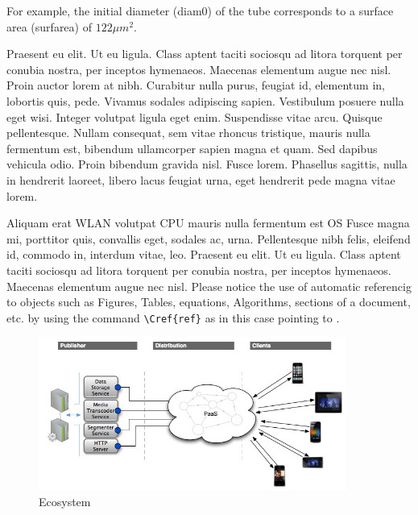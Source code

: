 For example, the initial diameter (\gls{diam0}) of the tube corresponds to a surface area (\gls{surfarea}) of $122 \mu{m}^2$.

Praesent eu elit. Ut eu ligula. Class aptent taciti sociosqu ad litora torquent per conubia nostra, per inceptos hymenaeos. Maecenas elementum augue nec nisl. Proin auctor lorem at nibh. Curabitur nulla purus, feugiat id, elementum in, lobortis quis, pede. Vivamus sodales adipiscing sapien. Vestibulum posuere nulla eget wisi. Integer volutpat ligula eget enim. Suspendisse vitae arcu. Quisque pellentesque. Nullam consequat, sem vitae rhoncus tristique, mauris nulla fermentum est, bibendum ullamcorper sapien magna et quam. Sed dapibus vehicula odio. Proin bibendum gravida nisl. Fusce lorem. Phasellus sagittis, nulla in hendrerit laoreet, libero lacus feugiat urna, eget hendrerit pede magna vitae lorem. 
 
Aliquam erat \ac{WLAN} volutpat \ac{CPU} mauris nulla fermentum est \ac{OS} Fusce magna mi, porttitor quis, convallis eget, sodales ac, urna.
Pellentesque nibh felis, eleifend id, commodo in, interdum vitae, leo. Praesent eu elit. Ut eu ligula. Class aptent taciti sociosqu ad litora torquent per conubia nostra, per inceptos hymenaeos. Maecenas elementum augue nec nisl. Please notice the use of automatic referencig to objects such as Figures, Tables, equations, Algorithms, sections of a document, etc. by using the command \verb:\Cref{ref}: as in this case pointing to .

\begin{figure}[htb]
\centering
\includegraphics[width=0.9\textwidth]{./Images/cashed5}
\caption{Ecosystem}
\label{fig:cashed}
\end{figure}

